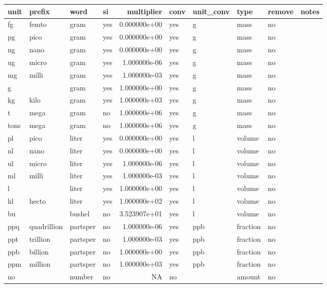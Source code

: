 
\begin{tabular}{l|l|l|l|r|l|l|l|l|l}
\hline
unit & prefix & word & si & multiplier & conv & unit\_conv & type & remove & notes\\
\hline
fg & femto & gram & yes & 0.000000e+00 & yes & g & mass & no & \\
\hline
pg & pico & gram & yes & 0.000000e+00 & yes & g & mass & no & \\
\hline
ng & nano & gram & yes & 0.000000e+00 & yes & g & mass & no & \\
\hline
ug & micro & gram & yes & 1.000000e-06 & yes & g & mass & no & \\
\hline
mg & milli & gram & yes & 1.000000e-03 & yes & g & mass & no & \\
\hline
g &  & gram & yes & 1.000000e+00 & yes & g & mass & no & \\
\hline
kg & kilo & gram & yes & 1.000000e+03 & yes & g & mass & no & \\
\hline
t & mega & gram & no & 1.000000e+06 & yes & g & mass & no & \\
\hline
tons & mega & gram & no & 1.000000e+06 & yes & g & mass & no & \\
\hline
pl & pico & liter & yes & 0.000000e+00 & yes & l & volume & no & \\
\hline
nl & nano & liter & yes & 0.000000e+00 & yes & l & volume & no & \\
\hline
ul & micro & liter & yes & 1.000000e-06 & yes & l & volume & no & \\
\hline
ml & milli & liter & yes & 1.000000e-03 & yes & l & volume & no & \\
\hline
l &  & liter & yes & 1.000000e+00 & yes & l & volume & no & \\
\hline
hl & hecto & liter & yes & 1.000000e+02 & yes & l & volume & no & \\
\hline
bu &  & bushel & no & 3.523907e+01 & yes & l & volume & no & \\
\hline
ppq & quadrillion & partsper & no & 1.000000e-06 & yes & ppb & fraction & no & \\
\hline
ppt & trillion & partsper & no & 1.000000e-03 & yes & ppb & fraction & no & \\
\hline
ppb & billion & partsper & no & 1.000000e+00 & yes & ppb & fraction & no & \\
\hline
ppm & million & partsper & no & 1.000000e+03 & yes & ppb & fraction & no & \\
\hline
no &  & number & no & NA & no &  & amount & no & \\

\end{tabular}

